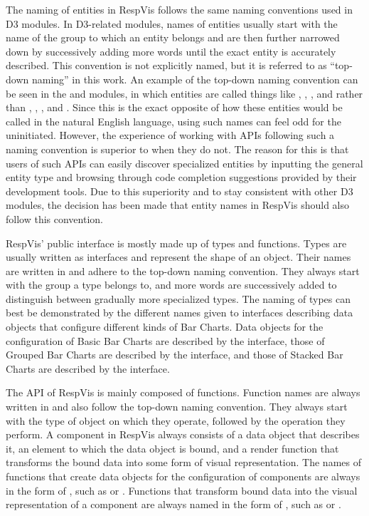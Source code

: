 The naming of entities in RespVis follows the same naming conventions
used in D3 modules.  In D3-related modules, names of entities usually
start with the name of the group to which an entity belongs and are
then further narrowed down by successively adding more words until the
exact entity is accurately described.  This convention is not
explicitly named, but it is referred to as \enquote{top-down naming}
in this work.  An example of the top-down naming convention can be
seen in the  \parencite{D3Scale} and 
\parencite{D3Axis} modules, in which entities are called things like
, , , and
 rather than , ,
, and .  Since this is the exact
opposite of how these entities would be called in the natural English
language, using such names can feel odd for the uninitiated.  However,
the experience of working with APIs following such a naming convention
is superior to when they do not.  The reason for this is that users of
such APIs can easily discover specialized entities by inputting the
general entity type and browsing through code completion suggestions
provided by their development tools.  Due to this superiority and to
stay consistent with other D3 modules, the decision has been made that
entity names in RespVis should also follow this convention.

RespVis' public interface is mostly made up of types and functions.
Types are usually written as interfaces and represent the shape of an
object.  Their names are written in  and adhere to
the top-down naming convention.  They always start with the group a
type belongs to, and more words are successively added to distinguish
between gradually more specialized types.  The naming of types can
best be demonstrated by the different names given to interfaces
describing data objects that configure different kinds of Bar Charts.
Data objects for the configuration of Basic Bar Charts are described
by the  interface, those of Grouped Bar Charts are
described by the  interface, and those of
Stacked Bar Charts are described by the 
interface.

The API of RespVis is mainly composed of functions.  Function names
are always written in  and also follow the top-down
naming convention.  They always start with the type of object on which
they operate, followed by the operation they perform.  A component in
RespVis always consists of a data object that describes it, an element
to which the data object is bound, and a render function that
transforms the bound data into some form of visual representation.
The names of functions that create data objects for the configuration
of components are always in the form of , such
as  or .  Functions that
transform bound data into the visual representation of a component are
always named in the form of , such as
 or .





